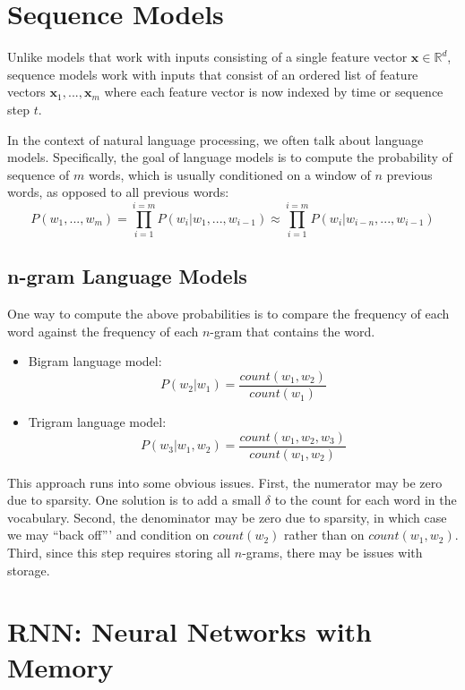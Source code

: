 \documentclass[
]{book}
\begin{document}
\hypertarget{sequence-models}{%
\section{Sequence Models}\label{sequence-models}}

Unlike models that work with inputs consisting of a single feature vector \(\mathbf{x}\in \mathbb{R}^d\), sequence models work with inputs that consist of an ordered list of feature vectors \(\mathbf{x}_1, ..., \mathbf{x}_m\) where each feature vector is now indexed by time or sequence step \(t\).

In the context of natural language processing, we often talk about language models. Specifically, the goal of language models is to compute the probability of sequence of \(m\) words, which is usually conditioned on a window of \(n\) previous words, as opposed to all previous words:
\[
P(w_1, ..., w_m) = \prod_{i=1}^{i=m} P(w_i | w_1,...,w_{i-1}) \approx \prod_{i=1}^{i=m} P(w_i | w_{i-n},...,w_{i-1})
\]

\hypertarget{n-gram-language-models}{%
\subsection{n-gram Language Models}\label{n-gram-language-models}}

One way to compute the above probabilities is to compare the frequency of each word against the frequency of each \(n\)-gram that contains the word.

\begin{itemize}
\item
  Bigram language model:
  \[
  P(w_2|w_1) = \frac{count(w_1, w_2)}{count(w_1)}
  \]
\item
  Trigram language model:
  \[
  P(w_3|w_1, w_2) = \frac{count(w_1, w_2, w_3)}{count(w_1, w_2)}
  \]
\end{itemize}

This approach runs into some obvious issues. First, the numerator may be zero due to sparsity. One solution is to add a small \(\delta\) to the count for each word in the vocabulary. Second, the denominator may be zero due to sparsity, in which case we may ``back off''' and condition on \(count(w_2)\) rather than on \(count(w_1, w_2)\). Third, since this step requires storing all \(n\)-grams, there may be issues with storage.

\hypertarget{rnn-neural-networks-with-memory}{%
\section{RNN: Neural Networks with Memory}\label{rnn-neural-networks-with-memory}}
\end{document}
